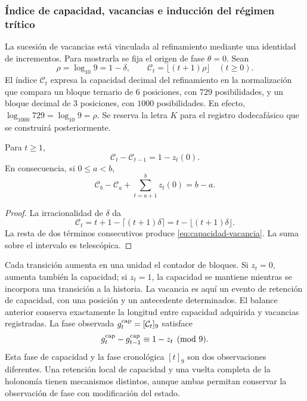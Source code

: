 \subsubsection{Índice de capacidad, vacancias e inducción del régimen trítico}
\label{vac-capacidad-trit}

La sucesión de vacancias está vinculada al refinamiento mediante una
identidad de incrementos. Para mostrarla se fija el origen de fase
\(\theta=0\). Sean
\[
 \rho=\log_{10}9=1-\delta,\qquad
 \mathcal C_t=\lfloor(t+1)\rho\rfloor\quad(t\geq0).
\]
El índice \(\mathcal C_t\) expresa la capacidad decimal del refinamiento
en la normalización que compara un bloque ternario de \(6\) posiciones,
con \(729\) posibilidades, y un bloque decimal de \(3\) posiciones, con
\(1000\) posibilidades. En efecto,
\(\log_{1000}729=\log_{10}9=\rho\). Se reserva la letra \(K\) para
el registro dodecafásico que se construirá posteriormente.

\begin{proposition}
\label{prop:capacidad-vacancia}
Para \(t\geq1\),
\begin{equation}
 \mathcal C_t-\mathcal C_{t-1}=1-z_t(0).
 \label{eq:capacidad-vacancia}
\end{equation}
En consecuencia, si \(0\leq a<b\),
\[
 \mathcal C_b-\mathcal C_a+
 \sum_{t=a+1}^{b}z_t(0)=b-a.
\]
\end{proposition}
\begin{proof}
La irracionalidad de \(\delta\) da
\[
 \mathcal C_t
 =t+1-\lceil(t+1)\delta\rceil
 =t-\lfloor(t+1)\delta\rfloor.
\]
La resta de dos términos consecutivos produce
\eqref{eq:capacidad-vacancia}. La suma sobre el intervalo es telescópica.
\end{proof}

Cada transición aumenta en una unidad el contador de bloques. Si
\(z_t=0\), aumenta también la capacidad; si \(z_t=1\), la capacidad se
mantiene mientras se incorpora una transición a la historia. La vacancia
es aquí un evento de retención de capacidad, con una posición y un
antecedente determinados. El balance anterior conserva exactamente la
longitud entre capacidad adquirida y vacancias registradas. La fase
observada \(g_t^{\rm cap}=[\mathcal C_t]_9\) satisface
\[
 g_t^{\rm cap}-g_{t-1}^{\rm cap}\equiv1-z_t\pmod9.
\]
Esta fase de capacidad y la fase cronológica \([t]_9\) son dos
observaciones diferentes. Una retención local de capacidad y una vuelta
completa de la holonomía tienen mecanismos distintos, aunque ambas
permitan conservar la observación de fase con modificación del estado.

